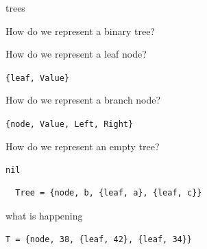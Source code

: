 \begin{frame}[fragile]{trees}

\pause How do we represent a binary tree?


\vspace{10pt}
\pause How do we represent a leaf node?

\vspace{10pt}
{\tt \{leaf, Value\}}

\vspace{20pt}
\pause How do we represent a branch node?

\vspace{10pt}
{\tt \{node, Value, Left, Right\}}

\vspace{10pt}
\pause How do we represent an empty tree?

\vspace{10pt}
{\tt nil}


\vspace{10pt}

\begin{verbatim}
  Tree = {node, b, {leaf, a}, {leaf, c}}
\end{verbatim}


\end{frame}


\begin{frame}{what is happening}

{\tt T = \{node, 38, \{leaf, 42\}, \{leaf, 34\}\}}

\pause \vspace{20pt}


\end{frame}

